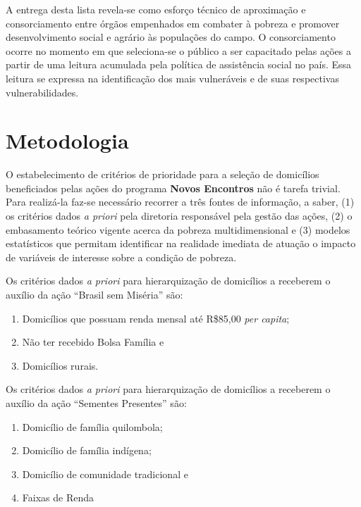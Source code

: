 \documentclass[a4paper, 12pt, openright, oneside, english, brazil, article]{abntex2}
\begin{document}
	A entrega desta lista revela-se como esforço técnico de aproximação e consorciamento entre órgãos empenhados em combater à pobreza e promover desenvolvimento social e agrário às populações do campo. O consorciamento ocorre no momento em que seleciona-se o público a ser capacitado pelas ações a partir de uma leitura acumulada pela política de assistência social no país. Essa leitura se expressa na identificação dos mais vulneráveis e de suas respectivas vulnerabilidades.
	
	
		
	\section{Metodologia}
	
	O estabelecimento de critérios de prioridade para a seleção de domicílios beneficiados pelas ações do programa \textbf{Novos Encontros} não é tarefa trivial. Para realizá-la faz-se necessário recorrer a três fontes de informação, a saber, (1) os critérios dados \textit{a priori} pela diretoria responsável pela gestão das ações, (2) o embasamento teórico vigente acerca da pobreza multidimensional e (3) modelos estatísticos que permitam identificar na realidade imediata de atuação o impacto de variáveis de interesse sobre a condição de pobreza.
	
	Os critérios dados \textit{a priori} para hierarquização de domicílios a receberem o auxílio da ação ``Brasil sem Miséria'' são:
	
	\begin{enumerate}
		\item Domicílios que possuam renda mensal até R\$85,00 \textit{per capita};
		\item Não ter recebido Bolsa Família e
		\item Domicílios rurais.
	\end{enumerate}

	Os critérios dados \textit{a priori} para hierarquização de domicílios a receberem o auxílio da ação ``Sementes Presentes'' são:
	
	\begin{enumerate}
		\item Domicílio de família quilombola;
		\item Domicílio de família indígena;
		\item Domicílio de comunidade tradicional e
		\item Faixas de Renda
	\end{enumerate}
\end{document}
